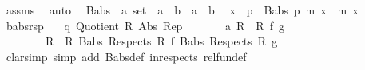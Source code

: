 \begin{isabellebody}
\ assms\ \isamarkupfalse%
\ auto%
\endisatagproof
{\isafoldproof}%
%
\isadelimproof
%
\endisadelimproof
%
\isadelimdocument
%
\endisadelimdocument
%
\isatagdocument
%
\isamarkuptrue%
%
\endisatagdocument
{\isafolddocument}%
%
\isadelimdocument
%
\endisadelimdocument
{}\isamarkupfalse%
\isanewline
\ \ Babs\ {\isacharcolon}{\kern0pt}{\isacharcolon}{\kern0pt}\ {\isachardoublequoteopen}{\isacharprime}{\kern0pt}a\ set\ {\isasymRightarrow}\ {\isacharparenleft}{\kern0pt}{\isacharprime}{\kern0pt}a\ {\isasymRightarrow}\ {\isacharprime}{\kern0pt}b{\isacharparenright}{\kern0pt}\ {\isasymRightarrow}\ {\isacharprime}{\kern0pt}a\ {\isasymRightarrow}\ {\isacharprime}{\kern0pt}b{\isachardoublequoteclose}\isanewline
{}\isanewline
\ \ {\isachardoublequoteopen}x\ {\isasymin}\ p\ {\isasymLongrightarrow}\ Babs\ p\ m\ x\ {\isacharequal}{\kern0pt}\ m\ x{\isachardoublequoteclose}\isanewline
\isanewline
{}\isamarkupfalse%
\ babs{\isacharunderscore}{\kern0pt}rsp{\isacharcolon}{\kern0pt}\isanewline
\ \ \ q{\isacharcolon}{\kern0pt}\ {\isachardoublequoteopen}Quotient{}\ R{}\ Abs{}\ Rep{}{\isachardoublequoteclose}\isanewline
\ \ \ \ \ \ \ a{\isacharcolon}{\kern0pt}\ {\isachardoublequoteopen}{\isacharparenleft}{\kern0pt}R{}\ {\isacharequal}{\kern0pt}{\isacharequal}{\kern0pt}{\isacharequal}{\kern0pt}{\isachargreater}{\kern0pt}\ R{}{\isacharparenright}{\kern0pt}\ f\ g{\isachardoublequoteclose}\isanewline
\ \ \ \ \ \ \ \ {\isachardoublequoteopen}{\isacharparenleft}{\kern0pt}R{}\ {\isacharequal}{\kern0pt}{\isacharequal}{\kern0pt}{\isacharequal}{\kern0pt}{\isachargreater}{\kern0pt}\ R{}{\isacharparenright}{\kern0pt}\ {\isacharparenleft}{\kern0pt}Babs\ {\isacharparenleft}{\kern0pt}Respects\ R{}{\isacharparenright}{\kern0pt}\ f{\isacharparenright}{\kern0pt}\ {\isacharparenleft}{\kern0pt}Babs\ {\isacharparenleft}{\kern0pt}Respects\ R{}{\isacharparenright}{\kern0pt}\ g{\isacharparenright}{\kern0pt}{\isachardoublequoteclose}\isanewline
%
\isadelimproof
%
\endisadelimproof
%
\isatagproof
{}\isamarkupfalse%
\ {\isacharparenleft}{\kern0pt}clarsimp\ simp\ add{\isacharcolon}{\kern0pt}\ Babs{\isacharunderscore}{\kern0pt}def\ in{\isacharunderscore}{\kern0pt}respects\ rel{\isacharunderscore}{\kern0pt}fun{\isacharunderscore}{\kern0pt}def{\isacharparenright}{\kern0pt}\isanewline
\ \ \isamarkupfalse%

\end{isabellebody}
